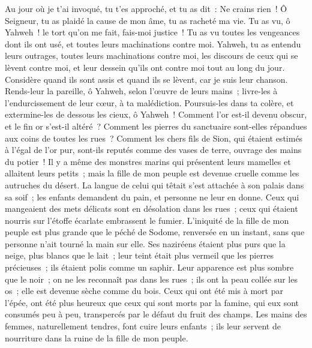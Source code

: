 \begin{multicols}{2}
Au jour où je t'ai invoqué, tu t'es approché, et tu as dit~: Ne crains rien~!
 Ô Seigneur, tu as plaidé la cause de mon âme, tu as racheté ma vie.
Tu as vu, ô Yahweh~! le tort qu'on me fait, fais-moi justice~!
Tu as vu toutes les vengeances dont ils ont usé, et toutes leurs machinations contre moi.
 Yahweh, tu as entendu leurs outrages, toutes leurs machinations contre moi,
les discours de ceux qui se lèvent contre moi, et leur dessein qu'ils ont contre moi tout au long du jour.
Considère quand ils sont assis et quand ils se lèvent, car je suis leur chanson.
 Rends-leur la pareille, ô Yahweh, selon l'œuvre de leurs mains~;
livre-les à l'endurcissement de leur cœur, à ta malédiction.
Poursuis-les dans ta colère, et extermine-les de dessous les cieux, ô Yahweh~!
\VerseOne{} Comment l'or est-il devenu obscur, et le fin or s'est-il altéré~? Comment les pierres du sanctuaire sont-elles répandues aux coins de toutes les rues~?
 Comment les chers fils de Sion, qui étaient estimés à l'égal de l'or pur, sont-ils reputés comme des vases de terre, ouvrage des mains du potier~!
 Il y a même des monstres marins qui présentent leurs mamelles et allaitent leurs petits~; mais la fille de mon peuple est devenue cruelle comme les autruches du désert.
 La langue de celui qui têtait s'est attachée à son palais dans sa soif~; les enfants demandent du pain, et personne ne leur en donne.
 Ceux qui mangeaient des mets délicats sont en désolation dans les rues~; ceux qui étaient nourris sur l'étoffe écarlate embrassent le fumier.
 L'iniquité de la fille de mon peuple est plus grande que le péché de Sodome, renversée en un instant, sans que personne n'ait tourné la main sur elle.
 Ses naziréens étaient plus purs que la neige, plus blancs que le lait~; leur teint était plus vermeil que les pierres précieuses~; ils étaient polis comme un saphir.
 Leur apparence est plus sombre que le noir~; on ne les reconnaît pas dans les rues~; ils ont la peau collée sur les os~; elle est devenue sèche comme du bois.
 Ceux qui ont été mis à mort par l'épée, ont été plus heureux que ceux qui sont morts par la famine, qui eux sont consumés peu à peu, transpercés par le défaut du fruit des champs.
 Les mains des femmes, naturellement tendres, font cuire leurs enfants~; ils leur servent de nourriture dans la ruine de la fille de mon peuple.

\end{multicols}
